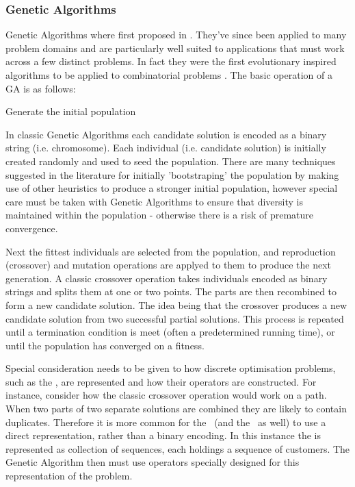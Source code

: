 \subsubsection{Genetic Algorithms}

Genetic Algorithms where first proposed in \cite{Holland:1975}. They've since been applied to many problem domains and are particularly well suited to applications that must work across a few distinct problems. In fact they were the first evolutionary inspired algorithms to be applied to combinatorial problems \cite{Potvin:2009}. The basic operation of a GA is as follows:

\begin{algorithm}
    Generate the initial population\\
\end{algorithm}

In classic Genetic Algorithms each candidate solution is encoded as a binary string (i.e. chromosome). Each individual (i.e. candidate solution) is initially created randomly and used to seed the population. There are many techniques suggested in the literature for initially 'bootstraping' the population by making use of other heuristics to produce a stronger initial population, however special care must be taken with Genetic Algorithms to ensure that diversity is maintained within the population - otherwise there is a risk of premature convergence. 

Next the fittest individuals are selected from the population, and reproduction (crossover) and mutation operations are applyed to them to produce the next generation. A classic crossover operation takes individuals encoded as binary strings and splits them at one or two points. The parts are then recombined to form a new candidate solution. The idea being that the crossover produces a new candidate solution from two successful partial solutions. This process is repeated until a termination condition is meet (often a predetermined running time), or until the population has converged on a fitness.

Special consideration needs to be given to how discrete optimisation problems, such as the \VRP, are represented and how their operators are constructed. For instance, consider how the classic crossover operation would work on a \TSP path. When two parts of two separate solutions are combined they are likely to contain duplicates. Therefore it is more common for the \VRP\ (and the \TSP\ as well) to use a direct representation, rather than a binary encoding. In this instance the \VRP is represented as collection of sequences, each holdings a sequence of customers. The Genetic Algorithm then must use operators specially designed for this representation of the problem. 

